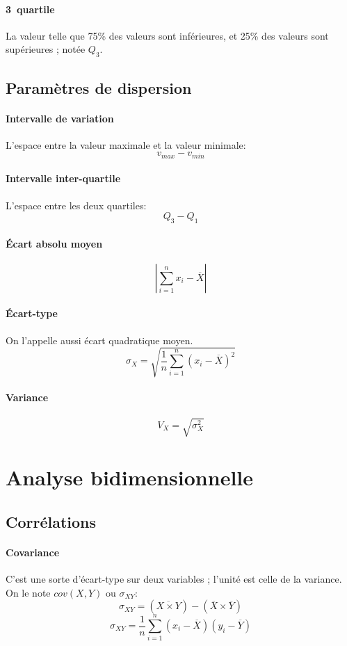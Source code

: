 \documentclass[10pt,a4paper,french]{article}
\begin{document}
\paragraph{3\ieme~quartile}
La valeur telle que 75\% des valeurs sont inférieures, et 25\% des valeurs sont supérieures ; notée $Q_3$.

\subsection{Paramètres de dispersion}

\paragraph{Intervalle de variation}
L'espace entre la valeur maximale et la valeur minimale: \[ v_{max} - v_{min} \]

\paragraph{Intervalle inter-quartile}
L'espace entre les deux quartiles: \[ Q_3 - Q_1 \]

\paragraph{Écart absolu moyen}
\[ \left\vert \sum_{i=1}^n x_i - \overline{X} \right\vert \]

\paragraph{Écart-type} On l'appelle aussi écart quadratique moyen.
\[ \sigma_X = \sqrt{\frac{1}{n} \sum_{i=1}^n (x_i - \overline{X})^2} \]

\paragraph{Variance}
\[ V_X = \sqrt{\sigma_X^2} \]

\section{Analyse bidimensionnelle}

\subsection{Corrélations}

\paragraph{Covariance}
C'est une sorte d'écart-type sur deux variables ; l'unité est celle de la variance. On le note $cov(X, Y)$ ou $\sigma_{XY}$:
\[ \sigma_{X Y} = (\overline{X \times Y}) - (\overline{X} \times \overline{Y}) \]
\[ \sigma_{X Y} = \frac{1}{n} \sum_{i=1}^n (x_i - \overline{X}) (y_i - \overline{Y}) \]
\end{document}
